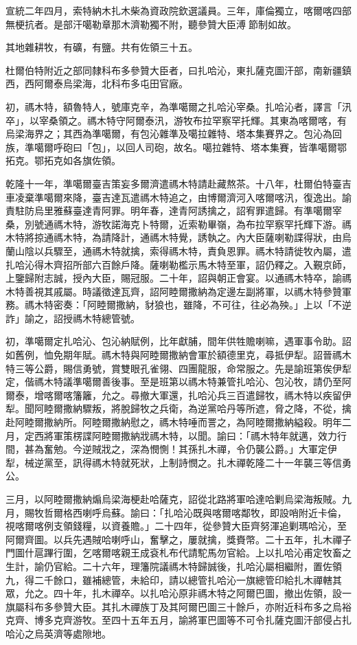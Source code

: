\begin{pinyinscope}
宣統二年四月，索特納木扎木柴為資政院欽選議員。三年，庫倫獨立，喀爾喀四部無梗抗者。是部汗噶勒章那木濟勒獨不附，聽參贊大臣溥節制如故。

其地雜耕牧，有礦，有鹽。共有佐領三十五。

杜爾伯特附近之部同隸科布多參贊大臣者，曰扎哈沁，東扎薩克圖汗部，南新疆鎮西，西阿爾泰烏梁海，北科布多屯田官廠。

初，禡木特，額魯特人，號庫克辛，為準噶爾之扎哈沁宰桑。扎哈沁者，譯言「汛卒」，以宰桑領之。禡木特守阿爾泰汛，游牧布拉罕察罕托輝。其東為喀爾喀，有烏梁海界之；其西為準噶爾，有包沁雜準及噶拉雜特、塔本集賽界之。包沁為回族，準噶爾呼砲曰「包」，以回人司砲，故名。噶拉雜特、塔本集賽，皆準噶爾鄂拓克。鄂拓克如各旗佐領。

乾隆十一年，準噶爾臺吉策妄多爾濟遣禡木特請赴藏熬茶。十八年，杜爾伯特臺吉車凌棄準噶爾來降，臺吉達瓦遣禡木特追之，由博爾濟河入喀爾喀汛，復逸出。諭責駐防烏里雅蘇臺達青阿罪。明年春，達青阿誘擒之，詔宥罪遣歸。有準噶爾宰桑，別號通禡木特，游牧諾海克卜特爾，近索勒畢嶺，為布拉罕察罕托輝下游。禡木特將掠通禡木特，為請降計，通禡木特覺，誘執之。內大臣薩喇勒諜得狀，由烏蘭山陰以兵驟至，通禡木特就擒，索得禡木特，責負恩罪。禡木特請徙牧內屬，遣扎哈沁得木齊招所部六百餘戶降。薩喇勒檻示馬木特至軍，詔仍釋之。入覲京師，上鑒歸附志誠，授內大臣，賜冠服。二十年，詔與朝正會宴。以通禡木特卒，諭禡木特善視其戚屬。時議徵達瓦齊，詔阿睦爾撒納為定邊左副將軍，以禡木特參贊軍務。禡木特密奏：「阿睦爾撒納，豺狼也，雖降，不可往，往必為殃。」上以「不逆詐」諭之，詔授禡木特總管號。

初，準噶爾定扎哈沁、包沁納賦例，比年獻脯，間年供牲贍喇嘛，遇軍事令助。詔如舊例，恤免期年賦。禡木特與阿睦爾撒納會軍於額德里克，尋抵伊犁。詔晉禡木特三等公爵，賜信勇號，賞雙眼孔雀翎、四團龍服，命常服之。先是諭班第俟伊犁定，偕禡木特議準噶爾善後事。至是班第以禡木特兼管扎哈沁、包沁牧，請仍至阿爾泰，增喀爾喀籓籬，允之。尋撤大軍還，扎哈沁兵三百遣歸牧，禡木特以疾留伊犁。聞阿睦爾撒納驟叛，將脫歸牧之兵衛，為逆黨哈丹等所遮，脅之降，不從，擒赴阿睦爾撒納所。阿睦爾撒納慰之，禡木特唾而詈之，為阿睦爾撒納縊殺。明年二月，定西將軍策楞諜阿睦爾撒納戕禡木特，以聞。諭曰：「禡木特年就邁，效力行間，甚為奮勉。今逆賊戕之，深為憫惻！其孫扎木禪，令仍襲公爵。」大軍定伊犁，械逆黨至，訊得禡木特就死狀，上制詩憫之。扎木禪乾隆二十一年襲三等信勇公。

三月，以阿睦爾撒納煽烏梁海梗赴哈薩克，詔從北路將軍哈達哈剿烏梁海叛賊。九月，賜牧哲爾格西喇呼烏蘇。諭曰：「扎哈沁既與喀爾喀鄰牧，即設哨附近卡倫，視喀爾喀例支領錢糧，以資養贍。」二十四年，從參贊大臣齊努渾追剿瑪哈沁，至阿爾齊圖。以兵先遇賊哈喇呼山，奮擊之，屢就擒，獎賚幣。二十五年，扎木禪子門圖什扈蹕行圍，乞喀爾喀親王成袞札布代請駝馬勿官給。上以扎哈沁甫定牧畜之生計，諭仍官給。二十六年，理籓院議禡木特歸誠後，扎哈沁屬相繼附，置佐領九，得二千餘口，雖補總管，未給印，請以總管扎哈沁一旗總管印給扎木禪轄其眾，允之。四十年，扎木禪卒。以扎哈沁原非禡木特之阿爾巴圖，撤出佐領，設一旗屬科布多參贊大臣。其扎木禪族丁及其阿爾巴圖三十餘戶，亦附近科布多之烏裕克齊、博多克齊游牧。至四十五年五月，諭將軍巴圖等不可令扎薩克圖汗部侵占扎哈沁之烏英濟等處隙地。


\end{pinyinscope}
